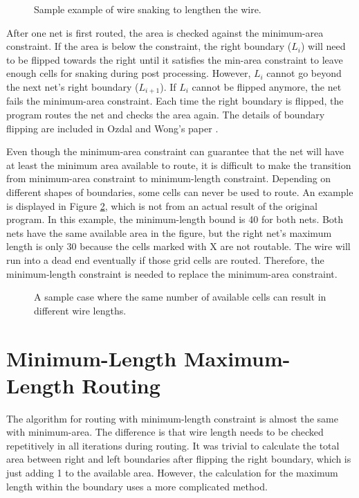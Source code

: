 \begin{figure}[here]
  \begin{center}
  \end{center}
  \caption{Sample example of wire snaking to lengthen the wire.}
  \label{fig:sample_snaking}
\end{figure}



After one net is first routed, the area is checked against the minimum-area constraint. If the area is below the constraint, the right boundary ($L_i$) will  need to be flipped towards the right until it satisfies the min-area constraint to leave enough cells for snaking during post processing. However, $L_i$ cannot go beyond the next net's right boundary ($L_{i+1}$). If $L_i$ cannot be flipped anymore, the net fails the minimum-area constraint. Each time the right boundary is flipped, the program routes the net and checks the area again. The details of boundary flipping are included in Ozdal and Wong's paper \cite{IEEEexample:ozdal_wong}.

Even though the minimum-area constraint can guarantee that the net will have at least the minimum area available to route, it is difficult to make the transition from minimum-area constraint to minimum-length constraint. Depending on different shapes of boundaries, some cells can never be used to route. An example is displayed in Figure \ref{fig:sample_Xarea}, which is not from an actual result of the original program. In this example, the minimum-length bound is 40 for both nets. Both nets have the same available area in the figure, but the right net's maximum length is only 30 because the cells marked with X are not routable. The wire will run into a dead end eventually if those grid cells are routed. Therefore, the minimum-length constraint is needed to replace the minimum-area constraint. 

\begin{figure}[here]
  \begin{center}
  \end{center}
  \caption{A sample case where the same number of available cells can result in different wire lengths.}
  \label{fig:sample_Xarea}
\end{figure}

\section{Minimum-Length Maximum-Length Routing}\label{sec-minlength}
The algorithm for routing with minimum-length constraint is almost the same with minimum-area. The difference is that wire length needs to be checked repetitively in all iterations during routing. It was trivial to calculate the total area between right and left boundaries after flipping the right boundary, which is just adding 1 to the available area. However, the calculation for the maximum length within the boundary uses a more complicated method. 

